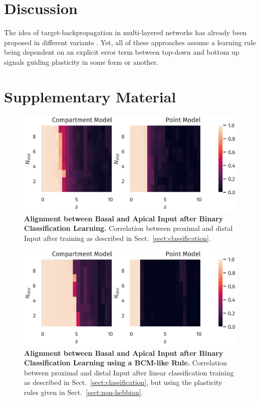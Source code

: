\documentclass[10pt,a4paper,twocolumn]{article}
\begin{document}
		\section{Discussion}
		
		The idea of target-backpropagation in multi-layered networks
		has already been proposed in different variants
		\cite{Bengio2014,Lee2015,Guerguiev2017}. Yet, all of these approaches
		assume a learning rule being dependent on an explicit error term 
		between top-down and bottom up signals guiding plasticity in some form
		or another.
		
		\section{Supplementary Material}
		\begin{figure}
			\includegraphics[width=\columnwidth]{classification_correlation_dimension_scaling}
			\caption{{\bf Alignment between Basal and Apical Input after Binary Classification Learning.}
				Correlation between proximal and distal Input after training as described in 
				Sect.~\ref{sect:classification}.}
			\label{fig:classification_correlation}
		\end{figure}
		
		\begin{figure}
			\includegraphics[width=\columnwidth]{classification_correlation_dimension_scaling_bcm}
			\caption{{\bf Alignment between Basal and Apical Input after Binary Classification Learning
					using a BCM-like Rule.}
				Correlation between proximal and distal Input after linear classification 
				training as described in Sect.~\ref{sect:classification}, but using the plasticity
				rules given in Sect.~\ref{sect:non-hebbian}.}
			\label{fig:classification_correlation_bcm}
		\end{figure}
		
		
		
		
		
\end{document}
